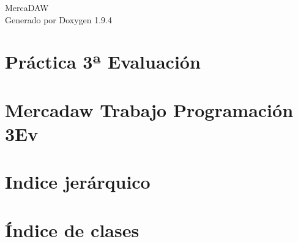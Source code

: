 \documentclass[twoside]{book}
\newcommand{\+}{\discretionary{\mbox{\scriptsize$\hookleftarrow$}}{}{}}
\newcommand{\clearemptydoublepage}{%
    \newpage{\pagestyle{empty}\cleardoublepage}%
  }
\begin{document}
  \raggedbottom
    \hypersetup{pageanchor=false,
                bookmarksnumbered=true,
                pdfencoding=unicode
               }
  \begin{titlepage}
  \vspace*{7cm}
  \begin{center}%
  {\Large Merca\+DAW}\\
  \vspace*{1cm}
  {\large Generado por Doxygen 1.9.4}\\
  \end{center}
  \end{titlepage}
  \clearemptydoublepage
  \tableofcontents
  \clearemptydoublepage
  \hypersetup{pageanchor=true}
\chapter{Práctica 3ª Evaluación}
\label{md__home_usuario__documentos_mercadaw_trabajo_ev3_analisis__analisis}

\chapter{Mercadaw Trabajo Programación 3Ev}
\label{md__home_usuario__documentos_mercadaw_trabajo_ev3__r_e_a_d_m_e}

\chapter{Indice jerárquico}

\chapter{Índice de clases}

\end{document}
